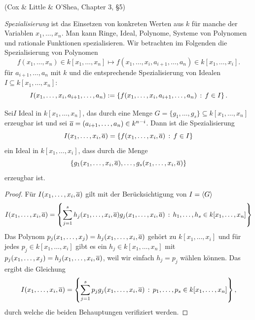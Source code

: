 \documentclass[11pt]{article}
\numberwithin{equation}{section}
\begin{document}
(Cox \& Little \& O'Shea, Chapter 3, \S5) 

\begin{definition}
	\emph{Spezialisierung} ist das Einsetzen von konkreten Werten aus $k$ für manche der Variablen $x_1,\ldots,x_n$. Man kann Ringe, Ideal, Polynome, Systeme von Polynomen und rationale Funktionen spezialisieren. Wir betrachten im Folgenden die Spezialisierung von Polynomen 
	\[
		f(x_1,\ldots,x_n) \in k[x_1,\ldots,x_n] \mapsto f(x_1,\ldots,x_i, a_{i+1},\ldots,a_n) \in k[x_1,\ldots,x_i]. 
	\]
	für $a_{i+1},\ldots,a_n$ mit $k$ und die entsprechende Spezialisierung von Idealen $I \subseteq k[x_1,\ldots,x_n]$: 
	\[
			I(x_1,\ldots,x_i,a_{i+1},\ldots,a_n) := \left\{  f(x_1,\ldots,x_i,a_{i+1},\ldots,a_n) \,:\, f \in I \right\}. 
	\]
\end{definition} 

\begin{proposition} \label{prop:spezialisierung}
	Sei$I$ Ideal in $k[x_1,\ldots,x_n]$, das durch eine Menge $G = \{g_1,\ldots,g_s\} \subseteq k[x_1,\ldots,x_n]$ erzeugbar ist und sei $\overline{a} = (a_{i+1},\ldots,a_n) \in k^{n-i}$. Dann ist die Spezialisierung 
	\[	
			I(x_1,\ldots,x_i,\overline{a}) = \left\{  f(x_1,\ldots,x_i,\overline{a})  \,:\, f \in I \right\}
	\]
	ein Ideal in $k[x_1,\ldots,x_i]$, dass durch die Menge
	\[
		\{ g_1(x_1,\ldots,x_i,\overline{a}), \ldots, g_s(x_1,\ldots,x_i,\overline{a}) \}
	\]
	erzeugbar ist. 
 \end{proposition} 
\begin{proof} 
	Für $I(x_1,\ldots,x_i, \overline{a})$ gilt mit der Berücksichtigung von $I = \left< G \right>$ 
	\[
		I (x_1,\ldots,x_i,\overline{a}) = \left\{ \sum_{j=1}^s h_j(x_1,\ldots,x_i,\overline{a}) g_j(x_1,\ldots,x_i,\overline{a}) \,:\, h_1,\ldots,h_s \in k[x_1,\ldots,x_n] \right\}
	\]
	Das Polynom $p_j(x_1,\ldots,x_j) = h_j(x_1,\ldots,x_i,\overline{a})$ gehört zu $k[x_1,\ldots,x_i]$ und für jedes $p_j \in k[x_1,\ldots,x_i]$ gibt es ein $h_j \in k[x_1,\ldots,x_n]$ mit $p_j(x_1,\ldots,x_j) = h_j(x_1,\ldots,x_i,\overline{a})$, weil wir einfach $h_j = p_j$ wählen können. Das ergibt die Gleichung
	\[
		I (x_1,\ldots,x_i,\overline{a}) = \left\{ \sum_{j=1}^s p_j g_j(x_1,\ldots,x_i,\overline{a}) \,:\, p_1,\ldots,p_s \in k[x_1,\ldots,x_n] \right\},
	\]
	durch welche die beiden Behauptungen verifiziert werden. 
\end{proof} 
\end{document}

